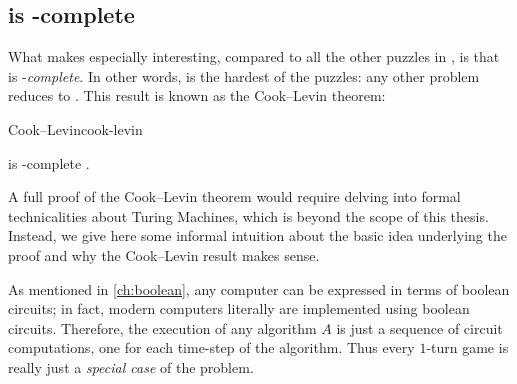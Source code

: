\subsection{ is \NP-complete}


What makes \CircSat{} especially interesting, compared to all the other puzzles
in \NP, is that \CircSat{} is \NP-\emph{complete}.  In other words, \CircSat{}
is the hardest of the \NP{} puzzles: any other \NP{} problem reduces to
\CircSat. This result is known as the Cook--Levin theorem:

\begin{theorem}{Cook--Levin}{cook-levin}

  \CircSat{} is \NP-complete \parencite{cook.np,levin.np}.

\end{theorem}

A full proof of the Cook--Levin theorem would require delving into formal
technicalities about Turing Machines, which is beyond the scope of this thesis.
Instead, we give here some informal intuition about the basic idea underlying
the proof and why the Cook--Levin result makes sense.

As mentioned in \cref{ch:boolean}, any computer can be expressed in terms of
boolean circuits; in fact, modern computers literally are implemented using
boolean circuits. Therefore, the execution of any algorithm \(A\) is just a
sequence of circuit computations, one for each time-step of the algorithm. Thus
every \(1\)-turn game is really just a \emph{special case} of the
 problem.

